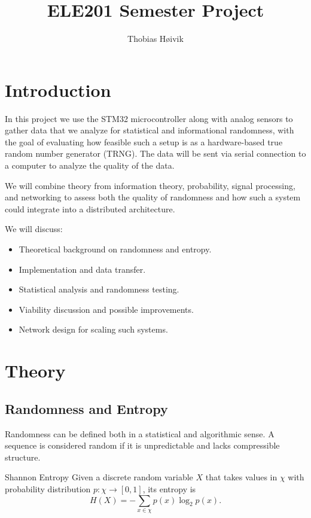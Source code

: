 

\title{\huge{ELE201 Semester Project}}
\author{\LARGE{Thobias Høivik}}
\date{}


\maketitle

\newpage
\tableofcontents

\newpage
\section{Introduction}
In this project we use the STM32 microcontroller along with analog 
sensors 
to gather data that we analyze for statistical and informational 
randomness, 
with the goal of evaluating how feasible such a setup is as a 
hardware-based true random number generator (TRNG). 
The data will be sent via serial connection to a computer 
to analyze the quality of the data.

We will combine theory from information theory, probability, 
signal processing, and networking to assess both the quality of 
randomness 
and how such a system could integrate into a distributed architecture.

We will discuss:
\begin{itemize}
    \item Theoretical background on randomness and entropy.
    \item Implementation and data transfer.
    \item Statistical analysis and randomness testing.
    \item Viability discussion and possible improvements.
    \item Network design for scaling such systems.
\end{itemize}

\newpage
\section{Theory}
\subsection{Randomness and Entropy}
Randomness can be defined both in a statistical and algorithmic sense. 
A sequence is considered random if it is unpredictable and lacks 
compressible structure.

\begin{defn}{Shannon Entropy}{}
Given a discrete random variable $X$ that takes values in $\chi$ with 
probability distribution $p:\chi \to [0,1]$, its entropy is
$$
    H(X) = - \sum_{x \in \chi} p(x) \log_2 p(x).
$$
\end{defn}

